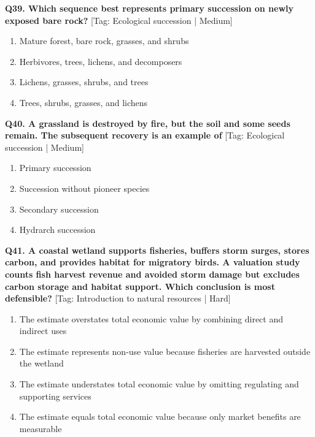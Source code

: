 \noindent\textbf{Q39. Which sequence best represents primary succession on newly exposed bare rock?} \hfill [Tag: Ecological succession | Medium]
\begin{enumerate}[label=(\alph*),topsep=2pt,itemsep=1pt,partopsep=0pt,parsep=0pt]
    \item {Mature forest, bare rock, grasses, and shrubs}
    \item {Herbivores, trees, lichens, and decomposers}
    \item {Lichens, grasses, shrubs, and trees}
    \item {Trees, shrubs, grasses, and lichens}
\end{enumerate}
\vspace{2mm}

\noindent\textbf{Q40. A grassland is destroyed by fire, but the soil and some seeds remain. The subsequent recovery is an example of} \hfill [Tag: Ecological succession | Medium]
\begin{enumerate}[label=(\alph*),topsep=2pt,itemsep=1pt,partopsep=0pt,parsep=0pt]
    \item {Primary succession}
    \item {Succession without pioneer species}
    \item {Secondary succession}
    \item {Hydrarch succession}
\end{enumerate}
\vspace{2mm}

\noindent\textbf{Q41. A coastal wetland supports fisheries, buffers storm surges, stores carbon, and provides habitat for migratory birds. A valuation study counts fish harvest revenue and avoided storm damage but excludes carbon storage and habitat support. Which conclusion is most defensible?} \hfill [Tag: Introduction to natural resources | Hard]
\begin{enumerate}[label=(\alph*),topsep=2pt,itemsep=1pt,partopsep=0pt,parsep=0pt]
    \item {The estimate overstates total economic value by combining direct and indirect uses}
    \item {The estimate represents non-use value because fisheries are harvested outside the wetland}
    \item {The estimate understates total economic value by omitting regulating and supporting services}
    \item {The estimate equals total economic value because only market benefits are measurable}
\end{enumerate}
\vspace{2mm}

